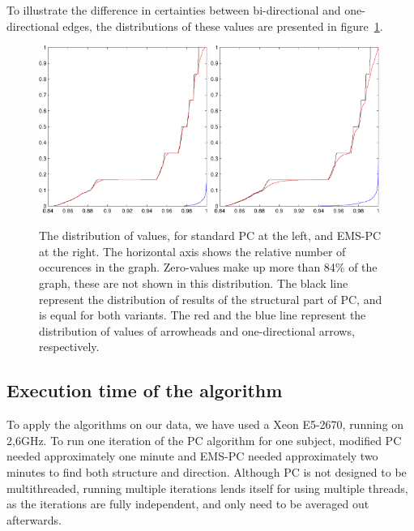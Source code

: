 \documentclass[a4paper, 10pt, english, onecolumn]{article}
\begin{document}
To illustrate the difference in certainties between bi-directional and one-directional edges, the distributions of these values are presented in figure~\ref{fig:distributions}.
\begin{figure}[h!]
  \centering
  \includegraphics[width=0.49\textwidth]{images/new/dist_all_mod_blackstruct_reddir_blueantisym-crop}
  \includegraphics[width=0.49\textwidth]{images/new/dist_all_expl_blackstruct_reddir_blueantisym-crop}
  \caption{The distribution of values, for standard PC at the left, and EMS-PC at the right. The horizontal axis shows the relative number of occurences in the graph. Zero-values make up more than 84\% of the graph, these are not shown in this distribution. The black line represent the distribution of results of the structural part of PC, and is equal for both variants. The red and the blue line represent the distribution of values of arrowheads and one-directional arrows, respectively.}
  \label{fig:distributions}
\end{figure}
 
\subsection{Execution time of the algorithm}
To apply the algorithms on our data, we have used a Xeon E5-2670, running on 2,6GHz.
To run one iteration of the PC algorithm for one subject, modified PC needed approximately one minute and EMS-PC needed approximately two minutes to find both structure and direction.
Although PC is not designed to be multithreaded, running multiple iterations lends itself for using multiple threads, as the iterations are fully independent, and only need to be averaged out afterwards.
\end{document}
